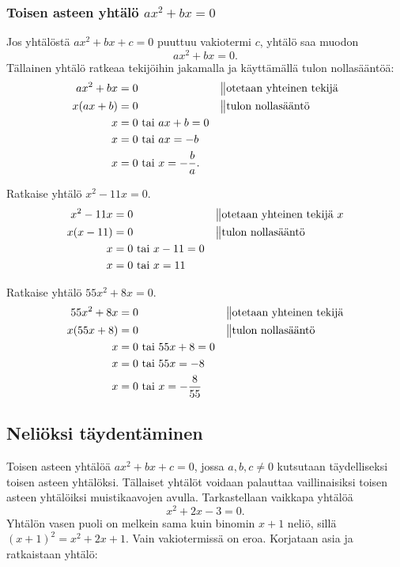 \subsubsection*{Toisen asteen yhtälö $ax^2+bx=0$}
Jos yhtälöstä $ax^2+bx+c=0$ puuttuu vakiotermi $c$, yhtälö saa muodon 
$$ax^2+bx=0.$$ Tällainen yhtälö ratkeaa tekijöihin jakamalla ja käyttämällä tulon nollasääntöä:
\begin{align*}
ax^2+bx&=0 \ \ \ \ \ &&\big\|\text{otetaan yhteinen tekijä} \\
x(ax+b)&=0 \ \ \ \ \ &&\big\|\text{tulon nollasääntö} \\
x&=0 \text{ tai } ax+b=0 \\
x&=0 \text{ tai } ax=-b \\
x&=0 \text{ tai } x=-\frac{b}{a}.
\end{align*}
\begin{esimerkki}
Ratkaise yhtälö $x^2-11x=0$.
\begin{align*}
x^2-11x&=0 \ \ \ \ \  &&\big\|\text{otetaan yhteinen tekijä } x\\
x(x-11)&=0 \ \ \ \ \ &&\big\|\text{tulon nollasääntö} \\
x&=0 \text{ tai } x-11=0 \\
x&=0 \text{ tai } x=11
\end{align*}
\end{esimerkki}

\begin{esimerkki}
Ratkaise yhtälö $55x^2+8x=0$.
\begin{align*}
55x^2+8x&=0 \ \ \ \ \ &&\big\|\text{otetaan yhteinen tekijä} \\
x(55x+8)&=0 \ \ \ \ \ &&\big\|\text{tulon nollasääntö} \\
x&=0 \text{ tai } 55x+8=0 \\
x&=0 \text{ tai } 55x=-8 \\
x&=0 \text{ tai } x=-\frac{8}{55}
\end{align*}
\end{esimerkki}


\subsection*{Neliöksi täydentäminen}
Toisen asteen yhtälöä $ax^2+bx+c=0$, jossa $a,b,c \neq 0$ kutsutaan
täydelliseksi toisen asteen yhtälöksi. Tällaiset yhtälöt voidaan palauttaa
vaillinaisiksi toisen asteen yhtälöiksi muistikaavojen avulla.
Tarkastellaan vaikkapa yhtälöä
\[x^2+2x-3=0.\]
Yhtälön vasen puoli on melkein sama kuin binomin $x+1$ neliö, sillä $(x+1)^2=x^2+2x+1$.
Vain vakiotermissä on eroa. Korjataan asia ja ratkaistaan yhtälö:

